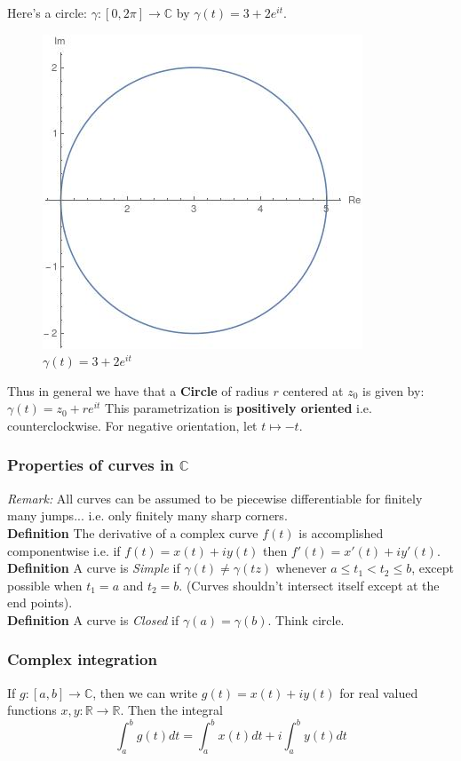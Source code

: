 \documentclass[a4paper, 11pt]{article}
\begin{document}
\noindent Here's a circle: $\gamma:[0,2\pi]\rightarrow\mathbb{C}$ by $\gamma(t)=3+2e^{it}$. \\
	\begin{figure}[!hbt]
		\centering
		\includegraphics[width=0.35\columnwidth]{parametricCircle}
		\caption{$\gamma(t) = 3 + 2e^{it}$}
	\end{figure}

\noindent Thus in general we have that a \textbf{Circle} of radius $r$ centered at $z_0$ is given by: $\gamma(t) = z_0 + re^{it}$ This parametrization is \textbf{positively oriented} i.e. counterclockwise. For negative orientation, let $t \mapsto -t$. \\

\subsubsection*{Properties of curves in $\mathbb{C}$} 
\textit{Remark:} All curves can be assumed to be piecewise differentiable for finitely many jumps... i.e. only finitely many sharp corners.\\

\noindent\textbf{Definition} The derivative of a complex curve $f(t)$ is accomplished componentwise i.e. if $f(t) = x(t)+iy(t)$ then $f'(t) = x'(t)+iy'(t)$.  \\

\noindent\textbf{Definition} A curve is \textit{Simple} if $\gamma(t)\neq\gamma(tz)$ whenever $a\leq t_1 < t_2 \leq b$, except possible when $t_1=a$ and $t_2=b$. (Curves shouldn't intersect itself except at the end points). \\

\noindent \textbf{Definition} A curve is \textit{Closed} if $\gamma(a) = \gamma(b)$. Think circle. 


\subsubsection*{Complex integration} 
If $g:[a,b]\rightarrow\mathbb{C}$, then we can write $g(t) = x(t) + i y(t)$ for real valued functions $x,y:\mathbb{R} \rightarrow \mathbb{R}$. Then the integral
	\begin{equation*}
		\int_a^b g(t)dt = \int_a^b x(t)dt + i\int_a^b y(t) dt
	\end{equation*}
	
\end{document}
